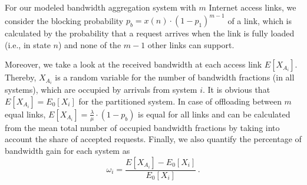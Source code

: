 For our modeled bandwidth aggregation system with $m$ Internet access links, we consider the blocking probability $p_{b} = x(n)\cdot (1-p_1)^{m-1}$ of a link, which is calculated by the probability that a request arrives when the link is fully loaded (i.e., in state $n$) and none of the $m-1$ other links can support.

Moreover, we take a look at the received bandwidth at each access link $E[X_{A_i}]$. Thereby, $X_{A_i}$ is a random variable for the number of bandwidth fractions (in all systems), which are occupied by arrivals from system $i$. It is obvious that $E[X_{A_i}] = E_0[X_i]$ for the partitioned system. In case of offloading between $m$ equal links, $E[X_{A_i}]= \frac{\lambda}{\mu}\cdot (1-p_{b})$ is equal for all links and can be calculated from the mean total number of occupied bandwidth fractions by taking into account the share of accepted requests.
Finally, we also quantify the percentage of bandwidth gain for each system as
\begin{equation}
\omega_i = \frac{E[X_{A_i}]-E_0[X_i]}{E_0[X_i]}\, .
\end{equation}
